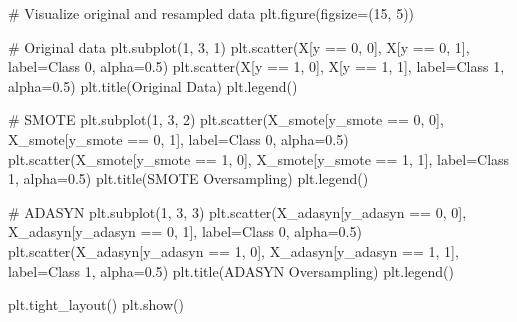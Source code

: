 \documentclass[
  letterpaper,
  DIV=11,
  numbers=noendperiod]{scrreprt}
\newenvironment{Shaded}{\begin{snugshade}}{\end{snugshade}}
\newcommand{\CommentTok}[1]{\textcolor[rgb]{0.37,0.37,0.37}{#1}}
\newcommand{\DecValTok}[1]{\textcolor[rgb]{0.68,0.00,0.00}{#1}}
\newcommand{\FloatTok}[1]{\textcolor[rgb]{0.68,0.00,0.00}{#1}}
\newcommand{\NormalTok}[1]{\textcolor[rgb]{0.00,0.23,0.31}{#1}}
\newcommand{\OperatorTok}[1]{\textcolor[rgb]{0.37,0.37,0.37}{#1}}
\newcommand{\StringTok}[1]{\textcolor[rgb]{0.13,0.47,0.30}{#1}}
\begin{document}
\begin{Shaded}
\begin{Highlighting}[]
\CommentTok{\# Visualize original and resampled data}
\NormalTok{plt.figure(figsize}\OperatorTok{=}\NormalTok{(}\DecValTok{15}\NormalTok{, }\DecValTok{5}\NormalTok{))}

\CommentTok{\# Original data}
\NormalTok{plt.subplot(}\DecValTok{1}\NormalTok{, }\DecValTok{3}\NormalTok{, }\DecValTok{1}\NormalTok{)}
\NormalTok{plt.scatter(X[y }\OperatorTok{==} \DecValTok{0}\NormalTok{, }\DecValTok{0}\NormalTok{], X[y }\OperatorTok{==} \DecValTok{0}\NormalTok{, }\DecValTok{1}\NormalTok{], label}\OperatorTok{=}\StringTok{\textquotesingle{}Class 0\textquotesingle{}}\NormalTok{, alpha}\OperatorTok{=}\FloatTok{0.5}\NormalTok{)}
\NormalTok{plt.scatter(X[y }\OperatorTok{==} \DecValTok{1}\NormalTok{, }\DecValTok{0}\NormalTok{], X[y }\OperatorTok{==} \DecValTok{1}\NormalTok{, }\DecValTok{1}\NormalTok{], label}\OperatorTok{=}\StringTok{\textquotesingle{}Class 1\textquotesingle{}}\NormalTok{, alpha}\OperatorTok{=}\FloatTok{0.5}\NormalTok{)}
\NormalTok{plt.title(}\StringTok{\textquotesingle{}Original Data\textquotesingle{}}\NormalTok{)}
\NormalTok{plt.legend()}

\CommentTok{\# SMOTE}
\NormalTok{plt.subplot(}\DecValTok{1}\NormalTok{, }\DecValTok{3}\NormalTok{, }\DecValTok{2}\NormalTok{)}
\NormalTok{plt.scatter(X\_smote[y\_smote }\OperatorTok{==} \DecValTok{0}\NormalTok{, }\DecValTok{0}\NormalTok{], X\_smote[y\_smote }\OperatorTok{==} \DecValTok{0}\NormalTok{, }\DecValTok{1}\NormalTok{], label}\OperatorTok{=}\StringTok{\textquotesingle{}Class 0\textquotesingle{}}\NormalTok{, alpha}\OperatorTok{=}\FloatTok{0.5}\NormalTok{)}
\NormalTok{plt.scatter(X\_smote[y\_smote }\OperatorTok{==} \DecValTok{1}\NormalTok{, }\DecValTok{0}\NormalTok{], X\_smote[y\_smote }\OperatorTok{==} \DecValTok{1}\NormalTok{, }\DecValTok{1}\NormalTok{], label}\OperatorTok{=}\StringTok{\textquotesingle{}Class 1\textquotesingle{}}\NormalTok{, alpha}\OperatorTok{=}\FloatTok{0.5}\NormalTok{)}
\NormalTok{plt.title(}\StringTok{\textquotesingle{}SMOTE Oversampling\textquotesingle{}}\NormalTok{)}
\NormalTok{plt.legend()}

\CommentTok{\# ADASYN}
\NormalTok{plt.subplot(}\DecValTok{1}\NormalTok{, }\DecValTok{3}\NormalTok{, }\DecValTok{3}\NormalTok{)}
\NormalTok{plt.scatter(X\_adasyn[y\_adasyn }\OperatorTok{==} \DecValTok{0}\NormalTok{, }\DecValTok{0}\NormalTok{], X\_adasyn[y\_adasyn }\OperatorTok{==} \DecValTok{0}\NormalTok{, }\DecValTok{1}\NormalTok{], label}\OperatorTok{=}\StringTok{\textquotesingle{}Class 0\textquotesingle{}}\NormalTok{, alpha}\OperatorTok{=}\FloatTok{0.5}\NormalTok{)}
\NormalTok{plt.scatter(X\_adasyn[y\_adasyn }\OperatorTok{==} \DecValTok{1}\NormalTok{, }\DecValTok{0}\NormalTok{], X\_adasyn[y\_adasyn }\OperatorTok{==} \DecValTok{1}\NormalTok{, }\DecValTok{1}\NormalTok{], label}\OperatorTok{=}\StringTok{\textquotesingle{}Class 1\textquotesingle{}}\NormalTok{, alpha}\OperatorTok{=}\FloatTok{0.5}\NormalTok{)}
\NormalTok{plt.title(}\StringTok{\textquotesingle{}ADASYN Oversampling\textquotesingle{}}\NormalTok{)}
\NormalTok{plt.legend()}

\NormalTok{plt.tight\_layout()}
\NormalTok{plt.show()}
\end{Highlighting}
\end{Shaded}
\end{document}
